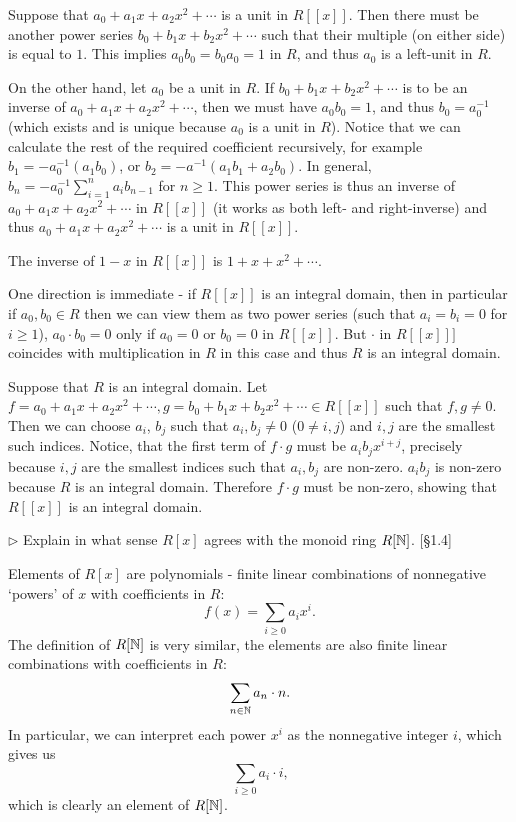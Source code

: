 \begin{solution}
	Suppose that $a_0 + a_1 x + a_2 x^2 + \cdots$ is a unit in $R[[x]]$. Then there must be another power series $b_0 + b_1 x + b_2 x^2 + \cdots$ such that their multiple (on either side) is equal to $1$. This implies $a_0 b_0 = b_0 a_0 = 1$ in $R$, and thus $a_0$ is a left-unit in $R$.
	
	On the other hand, let $a_0$ be a unit in $R$. If $b_0 + b_1 x + b_2 x^2 + \cdots$ is to be an inverse of $a_0 + a_1 x + a_2 x^2 + \cdots$, then we must have $a_0 b_0 = 1$, and thus $b_0 = a_0^{-1}$ (which exists and is unique because $a_0$ is a unit in $R$). Notice that we can calculate the rest of the required coefficient recursively, for example $b_1 = -a_0^{-1} (a_1 b_0)$, or $b_2 = -a^{-1} (a_1 b_1 + a_2 b_0)$. In general, $b_n = -a_0^{-1} \sum^{n}_{i=1}a_i b_{n-1}$ for $n \geq 1$. This power series is thus an inverse of $a_0 + a_1 x + a_2 x^2 + \cdots$ in $R[[x]]$ (it works as both left- and right-inverse) and thus $a_0 + a_1 x + a_2 x^2 + \cdots$ is a unit in $R[[x]]$.
	
	The inverse of $1 - x$ in $R[[x]]$ is $1 + x + x^2 + \cdots$.
	
	One direction is immediate - if $R[[x]]$ is an integral domain, then in particular if $a_0, b_0 \in R$ then we can view them as two power series (such that $a_i = b_i = 0$ for $i \geq 1$), $a_0 \cdot b_0 = 0$ only if $a_0 = 0$ or $b_0 = 0$ in $R[[x]]$. But $\cdot$ in $R[[x]]]$ coincides with multiplication in $R$ in this case and thus $R$ is an integral domain.
	
	Suppose that $R$ is an integral domain. Let $f = a_0 + a_1 x + a_2 x^2 + \cdots, g = b_0 + b_1 x + b_2 x^2 + \cdots \in R[[x]]$ such that $f, g \neq 0$. Then we can choose $a_i$, $b_j$ such that $a_i, b_j \neq 0$ ($0 \neq i, j$) and $i, j$ are the smallest such indices. Notice, that the first term of $f \cdot g$ must be $a_i b_j x^{i+j}$, precisely because $i, j$ are the smallest indices such that $a_i, b_j$ are non-zero. $a_i b_j$ is non-zero because $R$ is an integral domain. Therefore $f \cdot g$ must be non-zero, showing that $R[[x]]$ is an integral domain.
\end{solution}

\begin{problem}
	$\triangleright$ Explain in what sense $R[x]$ agrees with the monoid ring $R[\mathbb{N}]$. [\S 1.4]
\end{problem}

\begin{solution}
	Elements of $R[x]$ are polynomials - finite linear combinations of nonnegative `powers' of $x$ with coefficients in $R$:
	\[
		f(x) = \sum_{i \geq 0} a_i x^i \text{.}
	\]
	The definition of $R[\mathbb{N}]$ is very similar, the elements are also finite linear combinations with coefficients in $R$:
	\[
		\sum_{n \in \mathbb{N}} a_n \cdot n \text{.}
	\]
	In particular, we can interpret each power $x^i$ as the nonnegative integer $i$, which gives us
	\[
		\sum_{i \geq 0} a_i \cdot i \text{,}
	\]
	which is clearly an element of $R[\mathbb{N}]$.
\end{solution}


